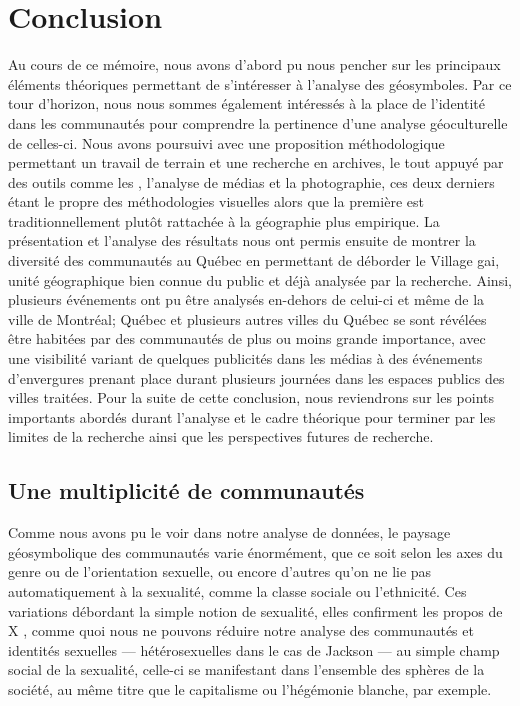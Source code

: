 \chapter*{Conclusion}

Au cours de ce mémoire, nous avons d'abord pu nous pencher sur les principaux éléments théoriques permettant de s'intéresser à l'analyse des géosymboles.
Par ce tour d'horizon, nous nous sommes également intéressés à la place de l'identité dans les communautés \lgbt{} pour comprendre la pertinence d'une analyse géoculturelle de celles-ci.
Nous avons poursuivi avec une proposition méthodologique permettant un travail de terrain et une recherche en archives, le tout appuyé par des outils comme les \sig{}, l'analyse de médias et la photographie, ces deux derniers étant le propre des méthodologies visuelles alors que la première est traditionnellement plutôt rattachée à la géographie plus empirique.
La présentation et l'analyse des résultats nous ont permis ensuite de montrer la diversité des communautés \lgbt{} au Québec en permettant de déborder le Village gai, unité géographique bien connue du public et déjà analysée par la recherche.
Ainsi, plusieurs événements ont pu être analysés en-dehors de celui-ci et même de la ville de Montréal; Québec et plusieurs autres villes du Québec se sont révélées être habitées par des communautés \lgbt{} de plus ou moins grande importance, avec une visibilité variant de quelques publicités dans les médias \lgbt à des événements d'envergures prenant place durant plusieurs journées dans les espaces publics des villes traitées.
Pour la suite de cette conclusion, nous reviendrons sur les points importants abordés durant l'analyse et le cadre théorique pour terminer par les limites de la recherche ainsi que les perspectives futures de recherche.

\section{Une multiplicité de communautés}
\label{sec:une_multiplicite_de_communautes}

Comme nous avons pu le voir dans notre analyse de données, le paysage géosymbolique des communautés \lgbt{} varie énormément, que ce soit selon les axes du genre ou de l'orientation sexuelle, ou encore d'autres qu'on ne lie pas automatiquement à la sexualité, comme la classe sociale ou l'ethnicité.
Ces variations débordant la simple notion de sexualité, elles confirment les propos de X , comme quoi nous ne pouvons réduire notre analyse des communautés et identités sexuelles --- hétérosexuelles dans le cas de Jackson --- au simple champ social de la sexualité, celle-ci se manifestant dans l'ensemble des sphères de la société, au même titre que le capitalisme ou l'hégémonie blanche, par exemple.

